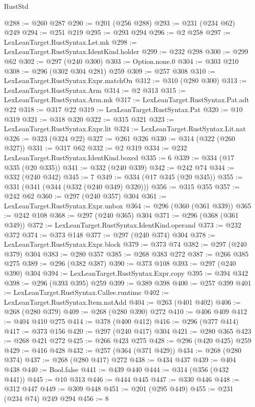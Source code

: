 \begin{lexlean}{RustStd}
\begin{coremodule}
@288 := @260 @287
@290 := @201 (@256 @288)
@293 := @231 (@234 @62) @249
@294 := @251 @219
@295 := @293 @294
@296 := @2 @258
@297 := LexLeanTarget.RustSyntax.Let.mk
@298 := LexLeanTarget.RustSyntax.IdentKind.holder
@299 := @232 @298
@300 := @299 @62
@302 := @297 (@240 @300)
@303 := Option.none.{0}
@304 := @303 @210
@308 := @296 (@302 @304 @281) @259
@309 := @257 @308
@310 := LexLeanTarget.RustSyntax.Expr.matchOn
@312 := @310 (@280 @300)
@313 := LexLeanTarget.RustSyntax.Arm
@314 := @2 @313
@315 := LexLeanTarget.RustSyntax.Arm.mk
@317 := LexLeanTarget.RustSyntax.Pat.adt @22
@318 := @317 @22
@319 := LexLeanTarget.RustSyntax.Pat
@320 := @10 @319
@321 := @318 @320
@322 := @315 @321
@323 := LexLeanTarget.RustSyntax.Expr.lit
@324 := LexLeanTarget.RustSyntax.Lit.nat
@326 := @323 (@324 @22)
@327 := @261 @326
@330 := @314 (@322 (@260 @327))
@331 := @317 @62
@332 := @2 @319
@334 := @232 LexLeanTarget.RustSyntax.IdentKind.boxed
@335 := 6
@339 := @334 (@17 @335 (@20 @335))
@341 := @332 (@240 @339)
@342 := @242 @74
@344 := @332 (@240 @342)
@345 := 7
@349 := @334 (@17 @345 (@20 @345))
@355 := @331 (@341 (@344 (@332 (@240 @349) @320)))
@356 := @315 @355
@357 := @242 @62
@360 := @297 (@240 @357) @304
@361 := LexLeanTarget.RustSyntax.Expr.unbox
@364 := @296 (@360 (@361 @339))
@365 := @242 @108
@368 := @297 (@240 @365) @304
@371 := @296 (@368 (@361 @349))
@372 := LexLeanTarget.RustSyntax.IdentKind.operand
@373 := @232 @372
@374 := @373 @148
@377 := @297 (@240 @374) @304
@378 := LexLeanTarget.RustSyntax.Expr.block
@379 := @373 @74
@382 := @297 (@240 @379) @304
@383 := @280 @357
@385 := @268 @383 @272
@387 := @266 @385 @275
@389 := @296 (@382 @387)
@390 := @373 @108
@393 := @297 (@240 @390) @304
@394 := LexLeanTarget.RustSyntax.Expr.copy
@395 := @394 @342
@398 := @296 (@393 @395) @259
@399 := @389 @398
@400 := @257 @399
@401 := LexLeanTarget.RustSyntax.Callee.runtime
@402 := LexLeanTarget.RustSyntax.Item.natAdd
@404 := @263 (@401 @402)
@406 := @268 (@280 @379)
@409 := @268 (@280 @390) @272
@410 := @406 @409
@412 := @404 @410 @275
@414 := @378 (@400 @412)
@416 := @296 (@377 @414)
@417 := @373 @156
@420 := @297 (@240 @417) @304
@421 := @280 @365
@423 := @268 @421 @272
@425 := @266 @423 @275
@428 := @296 (@420 @425) @259
@429 := @416 @428
@432 := @257 (@364 (@371 @429))
@434 := @268 (@280 @374)
@437 := @268 (@280 @417) @272
@438 := @434 @437
@439 := @404 @438
@440 := Bool.false
@441 := @439 @440
@444 := @314 (@356 (@432 @441))
@445 := @10 @313
@446 := @444 @445
@447 := @330 @446
@448 := @312 @447
@449 := @309 @448
@451 := @201 (@295 @449)
@455 := @231 (@234 @74) @249 @294
@456 := 8

\end{coremodule}
\end{lexlean}
